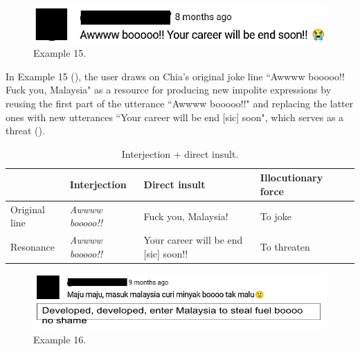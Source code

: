 \documentclass[english]{textolivre}
\begin{document}
\begin{figure}[h!]
    \centering
    \begin{minipage}{0.5\linewidth}
    \includegraphics[width=\linewidth]{imagens/exemplo15.png}
    \caption{Example 15.}\label{example-15}
    \end{minipage}
\end{figure}


In Example 15 (), the user draws on Chia’s original joke line ``Awwww booooo!! Fuck you, Malaysia" as a resource for producing new impolite expressions by reusing the first part of the utterance ``Awwww booooo!!" and replacing the latter ones with new utterances ``Your career will be end [sic] soon", which serves as a threat ().

\begin{table}[h!]
\centering
\begin{threeparttable}
\caption{Interjection + direct insult.}\label{tab-8}
\begin{tabular}{lllll}
\toprule
& Interjection & Direct insult & Illocutionary force \\
\midrule
Original line & \emph{Awwww booooo!!} & Fuck you, Malaysia! & To joke \\
Resonance & \emph{Awwww booooo!!} & Your career will be end [sic] soon!! & To threaten \\
\bottomrule
\end{tabular}
\end{threeparttable}
\end{table}

\begin{figure}[h!]
    \centering
    \begin{minipage}{0.70\linewidth}
    \includegraphics[width=\linewidth]{imagens/exemplo16.png}
    \caption{Example 16.}\label{example-16}
    \end{minipage}
\end{figure}
\end{document}
